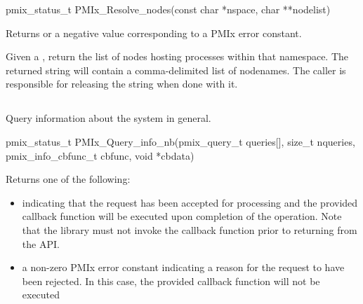 \cspecificstart
\begin{codepar}
pmix_status_t
PMIx_Resolve_nodes(const char *nspace, char **nodelist)
\end{codepar}
\cspecificend

\begin{arglist}
\end{arglist}

Returns  or a negative value corresponding to a PMIx error constant.

\descr

Given a , return the list of nodes hosting processes within that namespace.
The returned string will contain a comma-delimited list of nodenames.
The caller is responsible for releasing the string when done with it.


\subsection{}

\summary

Query information about the system in general.

\format

\cspecificstart
\begin{codepar}
pmix_status_t
PMIx_Query_info_nb(pmix_query_t queries[], size_t nqueries,
                   pmix_info_cbfunc_t cbfunc, void *cbdata)
\end{codepar}
\cspecificend

\begin{arglist}
\end{arglist}

Returns one of the following:

\begin{itemize}
\item {} indicating that the request has been accepted for processing and the provided callback function will be executed upon completion of the operation. Note that the library must not invoke the callback function prior to returning from the \ac{API}.
\item a non-zero \ac{PMIx} error constant indicating a reason for the request to have been rejected. In this case, the provided callback function will not be executed
\end{itemize}

